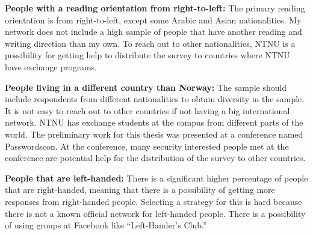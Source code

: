     {\bf People with a reading orientation from right-to-left:} 
    The primary reading orientation is from right-to-left, except some Arabic and Asian nationalities. My network does not include a high sample of people that have another reading and writing direction than my own. To reach out to other nationalities, NTNU is a possibility for getting help to distribute the survey to countries where NTNU have exchange programs. 
    
    {\bf People living in a different country than Norway:} 
    The sample should include respondents from different nationalities to obtain diversity in the sample. It is not easy to reach out to other countries if not having a big international network. NTNU has exchange students at the campus from different parts of the world. The preliminary work for this thesis was presented at a conference named Passwordscon. At the conference, many security interested people met at the conference are potential help for the distribution of the survey to other countries. 

    {\bf People that are left-handed:} 
    There is a significant higher percentage of people that are right-handed, meaning that there is a possibility of getting more responses from right-handed people. Selecting a strategy for this is hard because there is not a known official network for left-handed people. There is a possibility of using groups at Facebook like ``Left-Hander's Club.''

\clearpage
\mbox{}
\newpage
    